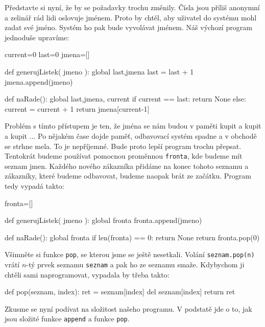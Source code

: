 Představte si nyní, že by se požadavky trochu změnily. Čísla jsou příliš anonymní a zelinář rád lidi oslovuje jménem. Proto by chtěl,
aby uživatel do systému mohl zadat své jméno. Systém ho pak bude vyvolávat jménem. Náš výchozí program jednoduše upravíme:

\begin{python}
current=0
last=0
jmena=[]

def generujListek( jmeno ):
    global last,jmena
    last = last + 1
    jmena.append(jmeno)
    
def naRade():
    global last,jmena, current
    if current == last:
        return None
    else:
        current = current + 1
    return jmena[current-1]
\end{python}

Problém s tímto přístupem je ten, že jména se nám budou v paměti kupit a kupit a kupit $\ldots$ Po nějakém čase dojde paměť, odbavovací systém spadne a 
v obchodě se strhne mela. To je nepříjemné. Bude proto lepší program trochu přepsat. Tentokrát budeme používat pomocnou proměnnou {\tt fronta}, kde
budeme mít seznam jmen. Každého nového zákazníka přidáme na konec tohoto seznamu a zákazníky, které budeme odbavovat, budeme naopak brát ze začátku.
Program tedy vypadá takto:

\begin{python}
fronta=[]

def generujListek( jmeno ):
    global fronta
    fronta.append(jmeno)
    
def naRade():
    global fronta
    if len(fronta) == 0:
        return None
    return fronta.pop(0)
\end{python}

Všimněte si funkce {\tt pop}, se kterou jsme se ještě nesetkali. Volání {\tt seznam.pop(n)} vrátí $n$-tý prvek seznamu {\tt seznam}
a pak ho ze seznamu smaže. Kdybychom ji chtěli sami naprogramovat, vypadala by třeba takto:

\begin{python}
def pop(seznam, index):
    ret = seznam[index]
    del seznam[index]
    return ret
\end{python}

Zkusme se nyní podívat na složitost našeho programu. V podstatě jde o to, jak jsou složité funkce {\tt append} a funkce {\tt pop}.

